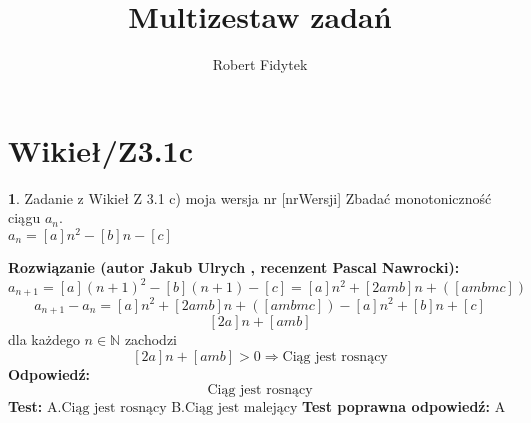 \documentclass[12pt, a4paper]{article}
\title{Multizestaw zadań}
\author{Robert Fidytek}
\date{}
\theoremstyle{definition} %
\newtheorem{zad}{}
\newcommand{\kategoria}[1]{\section{#1}} %
\newcommand{\zadStart}[1]{\begin{zad}#1\newline} %
\newcommand{\zadStop}{\end{zad}}   %
\newcommand{\rozwStart}[2]{\noindent \textbf{Rozwiązanie (autor #1 , recenzent #2): }\newline} %
\newcommand{\rozwStop}{\newline}                                            %
\newcommand{\odpStart}{\noindent \textbf{Odpowiedź:}\newline}    %
\newcommand{\odpStop}{\newline}                                             %
\newcommand{\testStart}{\noindent \textbf{Test:}\newline} %
\newcommand{\testStop}{\newline} %
\newcommand{\kluczStart}{\noindent \textbf{Test poprawna odpowiedź:}\newline} %
\newcommand{\kluczStop}{\newline} %
\begin{document}
\maketitle


\kategoria{Wikieł/Z3.1c}
\zadStart{Zadanie z Wikieł Z 3.1 c) moja wersja nr [nrWersji]}
Zbadać monotoniczność ciągu $a_{n}$.\\ $a_{n}=[a]n^{2}-[b]n-[c]$
\zadStop
\rozwStart{Jakub Ulrych}{Pascal Nawrocki}
$$a_{n+1}=[a](n+1)^{2}-[b](n+1)-[c]=[a]n^{2}+[2amb]n+([ambmc])$$
$$a_{n+1}-a_{n}=[a]n^{2}+[2amb]n+([ambmc])-[a]n^{2}+[b]n+[c]$$
$$[2a]n+[amb]$$
dla każdego $n\in\mathbb{N}$ zachodzi
$$[2a]n+[amb]>0\Rightarrow\text{Ciąg jest rosnący}$$
\rozwStop
\odpStart
$$\text{Ciąg jest rosnący}$$
\odpStop
\testStart
A.$\text{Ciąg jest rosnący}$
B.$\text{Ciąg jest malejący}$
\testStop
\kluczStart
A
\kluczStop
\end{document}
